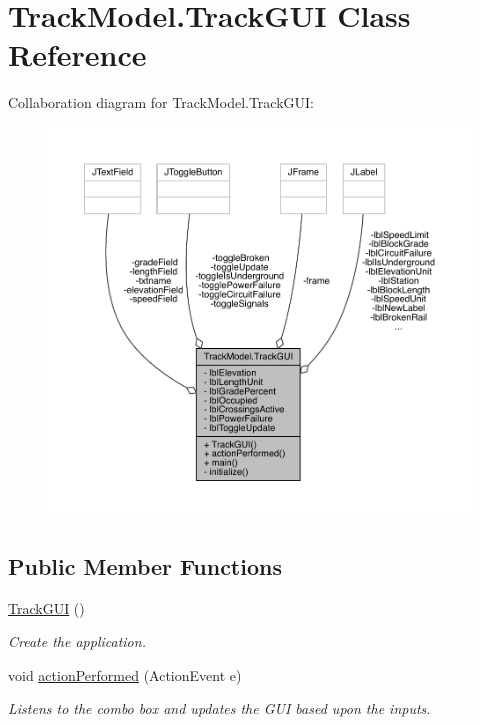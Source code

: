 \hypertarget{classTrackModel_1_1TrackGUI}{}\section{Track\+Model.\+Track\+G\+UI Class Reference}
\label{classTrackModel_1_1TrackGUI}


Collaboration diagram for Track\+Model.\+Track\+G\+UI\+:
\nopagebreak
\begin{figure}[H]
\begin{center}
\leavevmode
\includegraphics[width=350pt]{classTrackModel_1_1TrackGUI__coll__graph}
\end{center}
\end{figure}
\subsection*{Public Member Functions}
\begin{DoxyCompactItemize}
\item 
\hyperlink{classTrackModel_1_1TrackGUI_a9c9ef6bb307ee64e6eb01f881588f740}{Track\+G\+UI} ()
\begin{DoxyCompactList}\small\item\em Create the application. \end{DoxyCompactList}\item 
void \hyperlink{classTrackModel_1_1TrackGUI_aa7c85f553a7540a8f20b2092d8a6ca8a}{action\+Performed} (Action\+Event e)
\begin{DoxyCompactList}\small\item\em Listens to the combo box and updates the G\+UI based upon the inputs. \end{DoxyCompactList}\end{DoxyCompactItemize}
